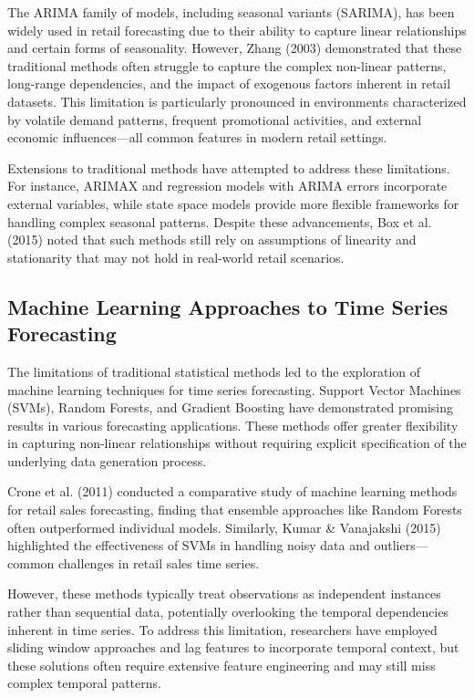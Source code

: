 \documentclass[conference]{IEEEtran}
\begin{document}
The ARIMA family of models, including seasonal variants (SARIMA), has been widely used in retail forecasting due to their ability to capture linear relationships and certain forms of seasonality. However, Zhang (2003) demonstrated that these traditional methods often struggle to capture the complex non-linear patterns, long-range dependencies, and the impact of exogenous factors inherent in retail datasets. This limitation is particularly pronounced in environments characterized by volatile demand patterns, frequent promotional activities, and external economic influences—all common features in modern retail settings.

Extensions to traditional methods have attempted to address these limitations. For instance, ARIMAX and regression models with ARIMA errors incorporate external variables, while state space models provide more flexible frameworks for handling complex seasonal patterns. Despite these advancements, Box et al. (2015) noted that such methods still rely on assumptions of linearity and stationarity that may not hold in real-world retail scenarios.

\subsection{Machine Learning Approaches to Time Series Forecasting}
The limitations of traditional statistical methods led to the exploration of machine learning techniques for time series forecasting. Support Vector Machines (SVMs), Random Forests, and Gradient Boosting have demonstrated promising results in various forecasting applications. These methods offer greater flexibility in capturing non-linear relationships without requiring explicit specification of the underlying data generation process.

Crone et al. (2011) conducted a comparative study of machine learning methods for retail sales forecasting, finding that ensemble approaches like Random Forests often outperformed individual models. Similarly, Kumar \& Vanajakshi (2015) highlighted the effectiveness of SVMs in handling noisy data and outliers—common challenges in retail sales time series.

However, these methods typically treat observations as independent instances rather than sequential data, potentially overlooking the temporal dependencies inherent in time series. To address this limitation, researchers have employed sliding window approaches and lag features to incorporate temporal context, but these solutions often require extensive feature engineering and may still miss complex temporal patterns.
\end{document}
